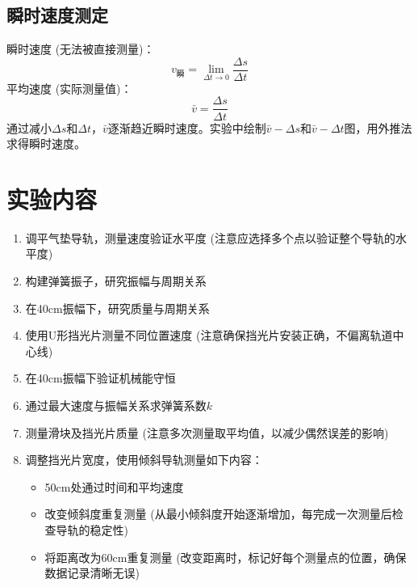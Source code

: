 \documentclass[zihao=5, UTF8]{article}
\theoremstyle{MyLineTheoremStyle} %
\theoremstyle{MyBlockTheoremStyle} %
\theoremstyle{MySubsubsectionStyle} %
\begin{document}
\subsection{瞬时速度测定}
瞬时速度 (无法被直接测量)：
\begin{equation}
v_{瞬} = \lim_{\Delta t \to 0}\frac{\Delta s}{\Delta t}
\end{equation}
平均速度 (实际测量值)：
\begin{equation}
\bar{v} = \frac{\Delta s}{\Delta t}
\end{equation}
通过减小$\Delta s$和$\Delta t$，$\bar{v}$逐渐趋近瞬时速度。实验中绘制$\bar{v}-\Delta s$和$\bar{v}-\Delta t$图，用外推法求得瞬时速度。

\section{实验内容}
\begin{enumerate}
    \item 调平气垫导轨，测量速度验证水平度 (注意应选择多个点以验证整个导轨的水平度)
    \item 构建弹簧振子，研究振幅与周期关系 
    \item 在40cm振幅下，研究质量与周期关系
    \item 使用U形挡光片测量不同位置速度 (注意确保挡光片安装正确，不偏离轨道中心线)
    \item 在40cm振幅下验证机械能守恒
    \item 通过最大速度与振幅关系求弹簧系数$k$
    \item 测量滑块及挡光片质量 (注意多次测量取平均值，以减少偶然误差的影响)
    \item 调整挡光片宽度，使用倾斜导轨测量如下内容：
        \begin{itemize}
            \item 50cm处通过时间和平均速度
            \item 改变倾斜度重复测量 (从最小倾斜度开始逐渐增加，每完成一次测量后检查导轨的稳定性)
            \item 将距离改为60cm重复测量 (改变距离时，标记好每个测量点的位置，确保数据记录清晰无误)
        \end{itemize}
\end{enumerate}
\end{document}

